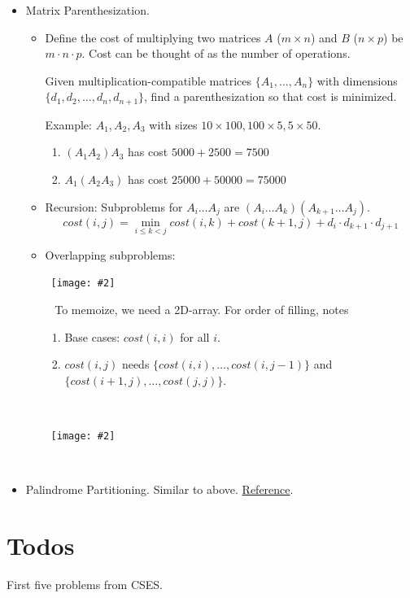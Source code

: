 \documentclass{article}
\newcommand{\image}[2]{\
    \begin{center}\
        \texttt{[image: \#2]}\
    \end{center}\
}
\begin{document}
\begin{sloppypar}
\begin{itemize}
        \item Matrix Parenthesization.
        \begin{itemize}
            \item Define the cost of multiplying two matrices $A$ ($m\times n$) and $B$ ($n\times p$) be $m\cdot n\cdot p$. Cost can be thought of as the number of operations.

            \noindent Given multiplication-compatible matrices $\{A_1,\dots,A_n\}$ with dimensions $\{d_1,d_2,\dots,d_n,d_{n+1}\}$, find a parenthesization so that cost is minimized.

            \noindent Example: $A_1, A_2, A_3$ with sizes $10\times 100, 100\times 5, 5\times 50$.
            \begin{enumerate}
                \item $(A_1 A_2)A_3$ has cost $5000+2500 = 7500$
                \item $A_1(A_2 A_3)$ has cost $25000+50000 = 75000$
            \end{enumerate}
            \item Recursion: Subproblems for $A_i\dots A_j$ are $(A_i\dots A_k)(A_{k+1}\dots A_j)$.
            $$cost(i,j) = \min_{i\le k < j}{cost(i,k) + cost(k+1,j) + d_i\cdot d_{k+1}\cdot d_{j+1}}$$
            \item Overlapping subproblems:
            \image{0.9}{../images/mat-paren.png}
            \noindent To memoize, we need a 2D-array. For order of filling, notes
            \begin{enumerate}
                \item Base cases: $cost(i,i)$ for all $i$.
                \item $cost(i,j)$ needs $\{cost(i,i),\dots,cost(i,j-1)\}$ and $\{cost(i+1,j),\dots,cost(j,j)\}$.
            \end{enumerate}
            \image{0.5}{../images/mat-paren-2.png}
        \end{itemize}

        \item Palindrome Partitioning. Similar to above. \href{https://www.geeksforgeeks.org/palindrome-partitioning-dp-17/}{Reference}.
    \end{itemize}

    \section{Todos}
    First five problems from CSES.


\end{sloppypar}
\end{document}
